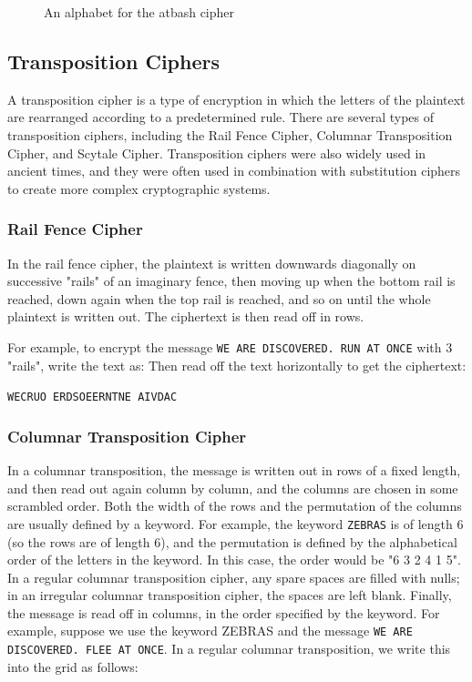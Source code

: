 \documentclass[11pt,a4paper]{report}
\begin{document}
\begin{figure}[h]
\caption{An alphabet for the atbash cipher}
\end{figure}



\subsection{Transposition Ciphers}

A transposition cipher is a type of encryption in which the letters of the plaintext are rearranged according to a predetermined rule.
There are several types of transposition ciphers, including the Rail Fence Cipher, Columnar Transposition Cipher, and Scytale Cipher.
Transposition ciphers were also widely used in ancient times, and they were often used in combination with substitution ciphers to create more complex cryptographic systems.
\subsubsection{Rail Fence Cipher}

In the rail fence cipher, the plaintext is written downwards diagonally on successive "rails" of an imaginary fence, then moving up when the bottom rail is reached, down again when the top rail is reached, and so on until the whole plaintext is written out.
The ciphertext is then read off in rows.

For example, to encrypt the message \verb|WE ARE DISCOVERED. RUN AT ONCE|
with 3 "rails", write the text as:
Then read off the text horizontally to get the ciphertext:

\verb|WECRUO ERDSOEERNTNE AIVDAC|
\subsubsection{Columnar Transposition Cipher}

In a columnar transposition, the message is written out in rows of a fixed length, and then read out again column by column, and the columns are chosen in some scrambled order.
Both the width of the rows and the permutation of the columns are usually defined by a keyword.
For example, the keyword \verb|ZEBRAS| is of length 6 (so the rows are of length 6), and the permutation is defined by the alphabetical order of the letters in the keyword.
In this case, the order would be "6 3 2 4 1 5".
In a regular columnar transposition cipher, any spare spaces are filled with nulls;
in an irregular columnar transposition cipher, the spaces are left blank.
Finally, the message is read off in columns, in the order specified by the keyword.
For example, suppose we use the keyword ZEBRAS and the message \verb|WE ARE DISCOVERED. FLEE AT ONCE|.
In a regular columnar transposition, we write this into the grid as follows:
\end{document}
